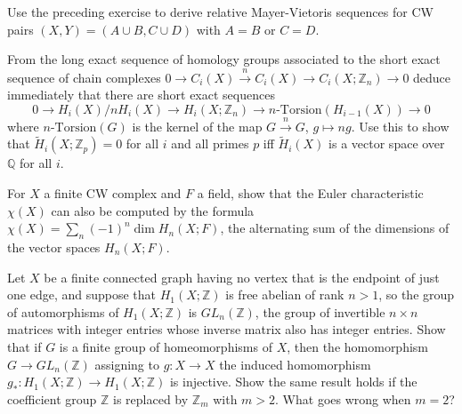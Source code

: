 \begin{exercise}
Use the preceding exercise to derive relative Mayer-Vietoris sequences for CW pairs $(X, Y) = (A \cup B, C \cup D)$ with $A = B$ or $C = D$.
\end{exercise}

\begin{exercise}
From the long exact sequence of homology groups associated to the short exact sequence of chain complexes $0 \to C_i(X) \xrightarrow{n} C_i(X) \to C_i(X; \mathbb{Z}_n) \to 0$ deduce immediately that there are short exact sequences
\[
0 \to H_i(X) / nH_i(X) \to H_i(X; \mathbb{Z}_n) \to n\text{-Torsion}(H_{i-1}(X)) \to 0
\]
where $n\text{-Torsion}(G)$ is the kernel of the map $G \xrightarrow{n} G$, $g \mapsto ng$. Use this to show that $\tilde{H}_i(X; \mathbb{Z}_p) = 0$ for all $i$ and all primes $p$ iff $\tilde{H}_i(X)$ is a vector space over $\mathbb{Q}$ for all $i$.
\end{exercise}

\begin{exercise}
For $X$ a finite CW complex and $F$ a field, show that the Euler characteristic $\chi(X)$ can also be computed by the formula $\chi(X) = \sum_n (-1)^n \dim H_n(X; F)$, the alternating sum of the dimensions of the vector spaces $H_n(X; F)$.
\end{exercise}

\begin{exercise}
Let $X$ be a finite connected graph having no vertex that is the endpoint of just one edge, and suppose that $H_1(X; \mathbb{Z})$ is free abelian of rank $n > 1$, so the group of automorphisms of $H_1(X; \mathbb{Z})$ is $GL_n(\mathbb{Z})$, the group of invertible $n \times n$ matrices with integer entries whose inverse matrix also has integer entries. Show that if $G$ is a finite group of homeomorphisms of $X$, then the homomorphism $G \to GL_n(\mathbb{Z})$ assigning to $g: X \to X$ the induced homomorphism $g_*: H_1(X; \mathbb{Z}) \to H_1(X; \mathbb{Z})$ is injective. Show the same result holds if the coefficient group $\mathbb{Z}$ is replaced by $\mathbb{Z}_m$ with $m > 2$. What goes wrong when $m = 2$?
\end{exercise}

